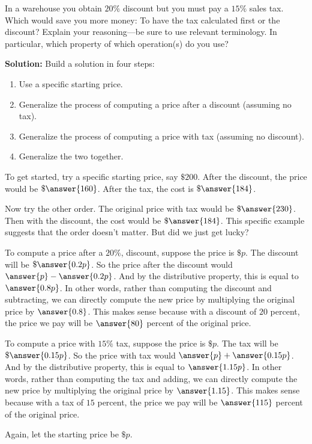 \documentclass[nooutcomes]{ximera}
\begin{document}

\begin{problem}In a warehouse you obtain $20\%$ discount but you must pay a
  $15\%$ sales tax. Which would save you more money: To have the tax
  calculated first or the discount? Explain your reasoning---be sure
  to use relevant terminology.  In particular, which property 
of which operation(s) do you use?  

\textbf{Solution:}  Build a solution in four steps: 
\begin{enumerate}
\item Use a specific starting price. 
\item Generalize the process of computing a price after a discount (assuming no tax).  
\item Generalize the process of computing a price with tax (assuming no discount). 
\item Generalize the two together. 
\end{enumerate}

To get started, try a specific starting price, say $\$200$.  After the discount, the price would be $\$\answer{160}$.  After the tax, the cost is $\$\answer{184}$.  

Now try the other order.  The original price with tax would be $\$\answer{230}$.  Then with the discount, the cost would be $\$\answer{184}$.  This specific example suggests that the order doesn't matter.  But did we just get lucky?  

\begin{problem}
To compute a price after a $20\%$, discount, suppose the price is $\$p$.  The discount will be $\$\answer{0.2p}$.  So the price after the discount would $\answer{p} - \answer{0.2p}$.  And by the distributive property, this is equal to $\answer{0.8p}$.  In other words, rather than computing the discount and subtracting, we can directly compute the new price by multiplying the original price by $\answer{0.8}$.  This makes sense because with a discount of $20$ percent, the price we pay will be $\answer{80}$ percent of the original price.  
\begin{problem}
To compute a price with $15\%$ tax, suppose the price is $\$p$.  The tax will be $\$\answer{0.15p}$.  So the price with tax would $\answer{p} + \answer{0.15p}$.  And by the distributive property, this is equal to $\answer{1.15p}$.  In other words, rather than computing the tax and adding, we can directly compute the new price by multiplying the original price by $\answer{1.15}$.  This makes sense because with a tax of $15$ percent, the price we pay will be $\answer{115}$ percent of the original price.  
\begin{problem}
Again, let the starting price be $\$p$.  


\end{problem}
\end{problem}
\end{problem}
\end{problem}
\end{document}
